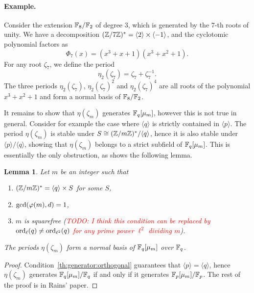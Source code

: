 \documentclass{article}
\newcommand{\todo}[1]{(\textcolor{red}{TODO: #1})}
\newtheorem{Lemma}{Lemma}
\begin{document}
\paragraph{Example.} Consider the extension $\mathbb{F}_8/\mathbb{F}_2$ of degree $3$,
which is generated by the $7$-th roots of unity. We have a decomposition $(\mathbb{Z}/7\mathbb{Z})^\ast=\langle
2\rangle\times\langle-1\rangle$, and the cyclotomic
polynomial factors as 
\begin{equation}
  \Phi_7(x) = (x^3 + x + 1) (x^3 + x^2 + 1).
\end{equation}
For any root $\zeta_7$, we define the period
\begin{equation}
  \eta_2(\zeta_7) = \zeta_7+\zeta_7^{-1}.
\end{equation}
The three periods $\eta_2(\zeta_7)$, $\eta_2(\zeta_7)^2$ and
$\eta_2(\zeta_7)^4$ are all roots of the polynomial $x^3+x^2+1$ and
form a normal basis of $\mathbb{F}_8/\mathbb{F}_2$.

It remains to show that $\eta(\zeta_m)$ generates $\mathbb{F}_q[\mu_m]$,
however this is not true in general. Consider for example the case
where $\langle q\rangle$ is strictly contained in $\langle
p\rangle$. The period $\eta(\zeta_m)$ is stable under
$S\cong(\mathbb{Z}/m\mathbb{Z})^\ast/\langle q\rangle$, hence it is also stable under
$\langle p\rangle/\langle q\rangle$, showing that $\eta(\zeta_m)$
belongs to a strict subfield of $\mathbb{F}_q[\mu_m]$. This is essentially the
only obstruction, as shows the following lemma.

\begin{Lemma}
  \label{th:generator} Let $m$ be an integer such that
  \begin{enumerate}
  \item $(\mathbb{Z}/m\mathbb{Z})^\ast = \langle q\rangle \times S$ for some $S$,
  \item\label{th:generator:orthogonal} $\gcd(\varphi(m), d)=1$,
  \item $m$ is squarefree \todo{I think this condition can be replaced
      by $\operatorname{ord}_\ell(q)\ne\operatorname{ord}_{\ell^2}(q)$ for any prime power
      $\ell^2$ dividing $m$}.
  \end{enumerate}

  The periods $\eta(\zeta_m)$ form a normal basis of $\mathbb{F}_q[\mu_m]$
  over $\mathbb{F}_q$.
\end{Lemma}
\begin{proof}
  Condition~\ref{th:generator:orthogonal} guarantees that $\langle
  p\rangle=\langle q\rangle$, hence $\eta(\zeta_m)$ generates
  $\mathbb{F}_q[\mu_m]/\mathbb{F}_q$ if and only if it generates
  $\mathbb{F}_p[\mu_m]/\mathbb{F}_p$. The rest of the proof is in Rains' paper.
\end{proof}
\end{document}
